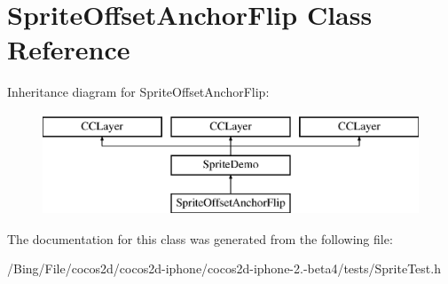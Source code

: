 \hypertarget{interface_sprite_offset_anchor_flip}{\section{Sprite\-Offset\-Anchor\-Flip Class Reference}
\label{interface_sprite_offset_anchor_flip}
}
Inheritance diagram for Sprite\-Offset\-Anchor\-Flip\-:\begin{figure}[H]
\begin{center}
\leavevmode
\includegraphics[height=3.000000cm]{interface_sprite_offset_anchor_flip}
\end{center}
\end{figure}


The documentation for this class was generated from the following file\-:\begin{DoxyCompactItemize}
\item 
/\-Bing/\-File/cocos2d/cocos2d-\/iphone/cocos2d-\/iphone-\/2.-\/beta4/tests/Sprite\-Test.\-h\end{DoxyCompactItemize}
